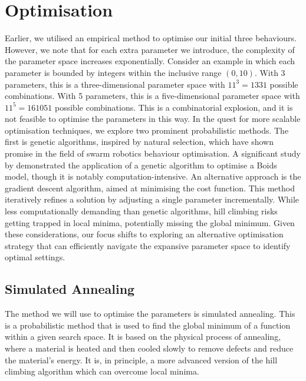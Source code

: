 \documentclass[12pt]{article}
\begin{document}
\section{Optimisation}
Earlier, we utilised an empirical method to optimise our initial three behaviours. However, we note that for each extra parameter we introduce, the complexity of the parameter space increases exponentially. Consider an example in which each parameter is bounded by integers within the inclusive range $(0,10)$. With 3 parameters, this is a three-dimensional parameter space with $11^3 = 1331$ possible combinations. With 5 parameters, this is a five-dimensional parameter space with $11^5 = 161051$ possible combinations. This is a combinatorial explosion, and it is not feasible to optimise the parameters in this way. In the quest for more scalable optimisation techniques, we explore two prominent probabilistic methods. The first is genetic algorithms, inspired by natural selection, which have shown promise in the field of swarm robotics behaviour optimisation. A significant study by \citet{Alaliyat2014OptimisationOB} demonstrated the application of a genetic algorithm to optimise a Boids model, though it is notably computation-intensive. An alternative approach is the gradient descent algorithm, aimed at minimising the cost function. This method iteratively refines a solution by adjusting a single parameter incrementally. While less computationally demanding than genetic algorithms, hill climbing risks getting trapped in local minima, potentially missing the global minimum. Given these considerations, our focus shifts to exploring an alternative optimisation strategy that can efficiently navigate the expansive parameter space to identify optimal settings.

\subsection{Simulated Annealing}
\label{sec:simulated-annealing}
The method we will use to optimise the parameters is simulated annealing. This is a probabilistic method that is used to find the global minimum of a function within a given search space. It is based on the physical process of annealing, where a material is heated and then cooled slowly to remove defects and reduce the material's energy. It is, in principle, a more advanced version of the hill climbing algorithm which can overcome local minima.
\end{document}
